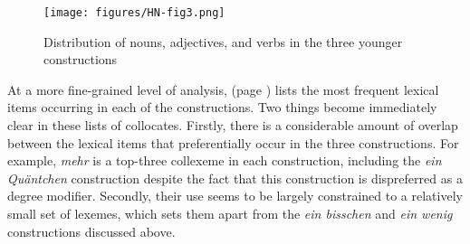 \documentclass[output=paper]{langsci/langscibook}
\begin{document}
\begin{figure}[p]
  \texttt{[image: figures/HN-fig3.png]}
  \caption{Distribution of nouns, adjectives, and verbs in the three younger constructions}\label{fig:mosaic}
\end{figure}

\begin{sloppypar}
At a more fine-grained level of analysis,  (page \pageref{tab:2:top20}) lists the most frequent lexical items occurring in each of the constructions. Two things become immediately clear in these lists of collocates. Firstly, there is a considerable amount of overlap between the lexical items that preferentially occur in the three constructions. For example, \textit{mehr} is a top-three collexeme in each construction, including the \textit{ein Quäntchen} construction despite the fact that this construction is dispreferred as a degree modifier. Secondly, their use seems to be largely constrained to a relatively small set of lexemes, which sets them apart from the \textit{ein bisschen} and \textit{ein wenig} constructions discussed above.
\end{sloppypar}\largerpage
\end{document}
